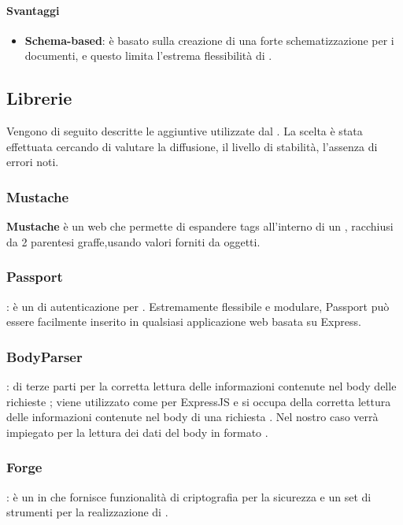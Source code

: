 \paragraph{Svantaggi}
\begin{itemize}
\item \textbf{Schema-based}: è basato sulla creazione di una forte schematizzazione per i
documenti, e questo limita l’estrema flessibilità di .
\end{itemize}

\subsection{Librerie}
Vengono di seguito descritte le  aggiuntive utilizzate dal . La scelta è stata effettuata cercando di valutare la diffusione, il livello di stabilità, l'assenza di errori noti.

	\subsubsection{Mustache}
\textbf{Mustache} è un web  che permette di espandere tags all'interno di un , racchiusi da 2 parentesi graffe,usando valori forniti da oggetti.

	\subsubsection{Passport}: \label{passport} è un  di autenticazione per . Estremamente flessibile e modulare, Passport può essere facilmente inserito in qualsiasi applicazione web basata su Express.

	\subsubsection{BodyParser}:  di terze parti per la corretta lettura delle informazioni contenute nel body delle richieste ; viene utilizzato come  per {ExpressJS} e si occupa della corretta lettura delle informazioni contenute nel body di una richiesta
. Nel nostro caso verrà impiegato per la lettura dei dati del body in formato .

	\subsubsection{Forge}: è un  in  che fornisce funzionalità di criptografia per la sicurezza e un set di strumenti per la realizzazione di . 

